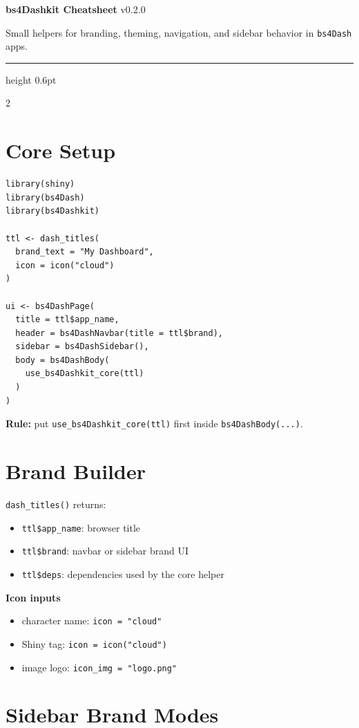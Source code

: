 \documentclass[10pt]{article}
\begin{document}
{\LARGE \textbf{\textcolor{dashblue}{bs4Dashkit Cheatsheet}}} \hfill {\large v0.2.0}

Small helpers for branding, theming, navigation, and sidebar behavior in
\texttt{bs4Dash} apps.

\vspace{0.3em}
\hrule height 0.6pt
\vspace{0.5em}

\begin{multicols}{2}

\section*{Core Setup}

\begin{lstlisting}[style=rstyle]
library(shiny)
library(bs4Dash)
library(bs4Dashkit)

ttl <- dash_titles(
  brand_text = "My Dashboard",
  icon = icon("cloud")
)

ui <- bs4DashPage(
  title = ttl$app_name,
  header = bs4DashNavbar(title = ttl$brand),
  sidebar = bs4DashSidebar(),
  body = bs4DashBody(
    use_bs4Dashkit_core(ttl)
  )
)
\end{lstlisting}

\textbf{Rule:} put \texttt{use\_bs4Dashkit\_core(ttl)} first inside
\texttt{bs4DashBody(...)}.

\section*{Brand Builder}

\texttt{dash\_titles()} returns:
\begin{itemize}
  \item \texttt{ttl\$app\_name}: browser title
  \item \texttt{ttl\$brand}: navbar or sidebar brand UI
  \item \texttt{ttl\$deps}: dependencies used by the core helper
\end{itemize}

\textbf{Icon inputs}
\begin{itemize}
  \item character name: \texttt{icon = "cloud"}
  \item Shiny tag: \texttt{icon = icon("cloud")}
  \item image logo: \texttt{icon\_img = "logo.png"}
\end{itemize}

\section*{Sidebar Brand Modes}


\end{multicols}
\end{document}
